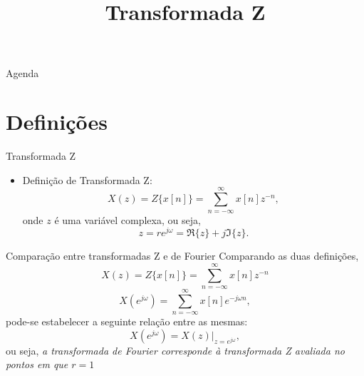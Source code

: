 


\title{\cursogrande\\ \vspace{1cm}Transformada Z}


   \maketitle[randomdots={false}]
   \begin{slide}{Agenda}
      \tableofcontents[content=sections]
   \end{slide}

\section[slide=true]{Definições}
\begin{slide}{Transformada Z}
\begin{itemize}
   \item Definição de Transformada Z:
   \begin{equation*}
      X(z) = Z\{x[n]\} = \sum_{n=-\infty}^{\infty}x[n]z^{-n},
   \end{equation*}
   onde $z$ é uma variável complexa, ou seja,
   \begin{equation*}
      z = re^{j\omega} = \Re\{z\}+j\Im\{z\}.
   \end{equation*}

%    
   
\end{itemize}
\end{slide}

\begin{slide}{Comparação entre transformadas Z e de Fourier}
Comparando as duas definições,
   \begin{equation*}
      X(z) = Z\{x[n]\} = \sum_{n=-\infty}^{\infty}x[n]z^{-n}
   \end{equation*}
   \begin{equation*}
      X(e^{j\omega})= \sum_{n=-\infty}^{\infty}x[n]e^{-j\omega n},
   \end{equation*}
pode-se estabelecer a seguinte relação entre as mesmas:
   \begin{equation*}
       X(e^{j\omega}) = X(z)|_{z = e^{j\omega}},
   \end{equation*}
   ou seja, \emph{a transformada de Fourier corresponde à transformada 
      Z avaliada no pontos em que $r = 1$}
\end{slide}
 
